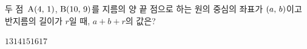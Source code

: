 두 점~$\mathrm{A}(4,\mkern3mu 1)$, $\mathrm{B}(10,\mkern3mu 9)$를 지름의 양 끝 점으로 하는 원의 중심의 좌표가 $(a,\mkern3mu b)$이고 반지름의 길이가 $r$일 때, $a+b+r$의 값은?
\begin{choices32}{$13$}{$14$}{$15$}{$16$}{$17$}\end{choices32}
